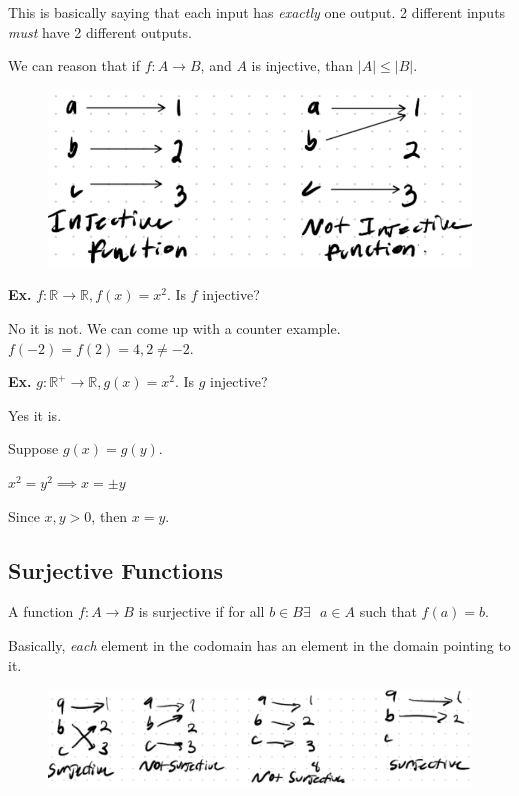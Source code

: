 \documentclass[12pt,letterpaper]{article} \usepackage{amsmath} \usepackage{graphicx}  \usepackage{longtable}  \usepackage{amssymb}
\begin{document}
        This is basically saying that each input has \emph{exactly} one output. 2 different inputs \emph{must} have 2 different outputs. 
        
        We can reason that if $f: A\rightarrow B$, and $A$ is injective, than $|A| \le |B|$.

        \begin{figure}[H]
            \centering
            \includegraphics[width=0.5\linewidth]{injective.png}
        \end{figure}

        \begin{mdframed}
            \textbf{Ex. } $f: \mathbb{R} \rightarrow \mathbb{R}, f(x)=x^2$. Is $f$ injective?

            No it is not. We can come up with a counter example. $f(-2)=f(2)=4, 2\ne -2$.
        \end{mdframed}

        \begin{mdframed}
            \textbf{Ex. } $g:\mathbb{R}^+\rightarrow\mathbb{R}, g(x)=x^2$. Is $g$ injective?

            Yes it is. 

            Suppose $g(x)=g(y)$.

            $x^2 = y^2 \implies x=\pm y$ 
            
            Since $x,y > 0$, then $x=y$.
        \end{mdframed}

        \subsection{Surjective Functions}
        A function $f:A\rightarrow B$ is surjective if for all $b\in B \exists \text{ } a\in A$ such that $f(a)=b$.

        Basically, \emph{each} element in the codomain has an element in the domain pointing to it. 

        \begin{figure}[H]
            \centering
            \includegraphics[width=0.8\linewidth]{surjective.png}
        \end{figure}
\end{document}
